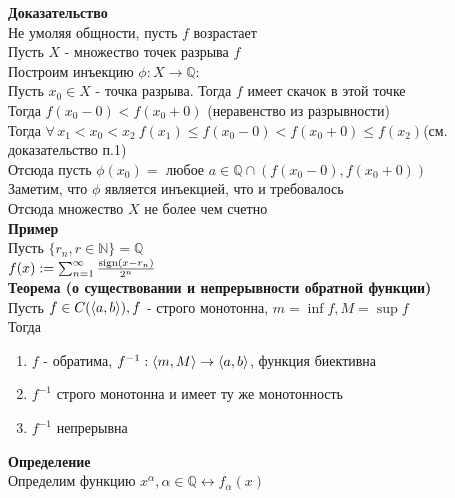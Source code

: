 \documentclass[12pt]{article}
\begin{document}
\textbf{Доказательство}\\
Не умоляя общности, пусть $f$ возрастает\\
Пусть $X$ - множество точек разрыва $f$\\
Построим инъекцию $\phi: X \rightarrow \mathbb{Q}$:\\
Пусть $x_0 \in X$ - точка разрыва. Тогда $f$ имеет скачок в этой точке\\
Тогда $f(x_0-0) < f(x_0+0)$ (неравенство из разрывности)\\
Тогда $\forall\,x_1<x_0<x_2\ f(x_1) \leq f(x_0-0) < f(x_0+0) \leq f(x_2)$(см. доказательство п.1)\\
Отсюда пусть $\phi(x_0) = $ любое $a \in \mathbb{Q} \cap (f(x_0-0), f(x_0+0))$\\
Заметим, что $\phi$ является инъекцией, что и требовалось\\
Отсюда множество $X$ не более чем счетно\\
\textbf{Пример}\\
Пусть $\{r_n, r\in \mathbb{N}\} = \mathbb{Q}$\\
$f(x) := \sum_{n=1}^\infty \frac{\operatorname{sign}(x-r_n)}{2^n}$\\
\textbf{Теорема (о существовании и непрерывности обратной функции)}\\
Пусть $f \in C(\langle a, b \rangle), f$ - строго монотонна, $m = \inf f, M = \sup f$\\
Тогда
\begin{enumerate}
    \item $f$ - обратима, $f^{-1}: \langle m, M\rangle \rightarrow \langle a, b \rangle$, функция биективна 
    \item $f^{-1}$ строго монотонна и имеет ту же монотонность
    \item $f^{-1}$ непрерывна
\end{enumerate}
\textbf{Определение}\\
Определим функцию $x^\alpha, \alpha \in \mathbb{Q} \leftrightarrow f_\alpha(x)$
\end{document}
